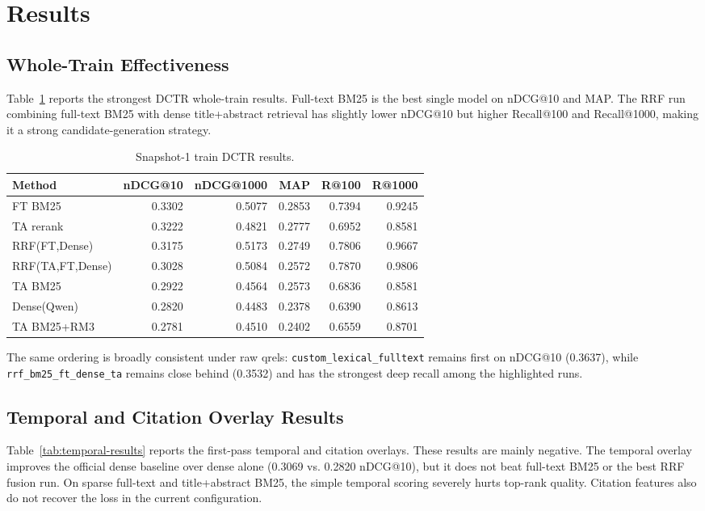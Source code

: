 \documentclass[11pt]{article}
\begin{document}
\section{Results}

\subsection{Whole-Train Effectiveness}

Table~\ref{tab:whole-train} reports the strongest DCTR whole-train results. Full-text BM25 is the best single model on nDCG@10 and MAP. The RRF run combining full-text BM25 with dense title+abstract retrieval has slightly lower nDCG@10 but higher Recall@100 and Recall@1000, making it a strong candidate-generation strategy.

\begin{table}[ht]
\centering
\caption{Snapshot-1 train DCTR results.}
\label{tab:whole-train}
\begin{tabular}{lrrrrr}
\toprule
Method & nDCG@10 & nDCG@1000 & MAP & R@100 & R@1000 \\
\midrule
FT BM25 & 0.3302 & 0.5077 & 0.2853 & 0.7394 & 0.9245 \\
TA rerank & 0.3222 & 0.4821 & 0.2777 & 0.6952 & 0.8581 \\
RRF(FT,Dense) & 0.3175 & 0.5173 & 0.2749 & 0.7806 & 0.9667 \\
RRF(TA,FT,Dense) & 0.3028 & 0.5084 & 0.2572 & 0.7870 & 0.9806 \\
TA BM25 & 0.2922 & 0.4564 & 0.2573 & 0.6836 & 0.8581 \\
Dense(Qwen) & 0.2820 & 0.4483 & 0.2378 & 0.6390 & 0.8613 \\
TA BM25+RM3 & 0.2781 & 0.4510 & 0.2402 & 0.6559 & 0.8701 \\
\bottomrule
\end{tabular}
\end{table}

The same ordering is broadly consistent under raw qrels: \texttt{custom\_lexical\_fulltext} remains first on nDCG@10 (0.3637), while \texttt{rrf\_bm25\_ft\_dense\_ta} remains close behind (0.3532) and has the strongest deep recall among the highlighted runs.

\subsection{Temporal and Citation Overlay Results}

Table~\ref{tab:temporal-results} reports the first-pass temporal and citation overlays. These results are mainly negative. The temporal overlay improves the official dense baseline over dense alone (0.3069 vs. 0.2820 nDCG@10), but it does not beat full-text BM25 or the best RRF fusion run. On sparse full-text and title+abstract BM25, the simple temporal scoring severely hurts top-rank quality. Citation features also do not recover the loss in the current configuration.
\end{document}
